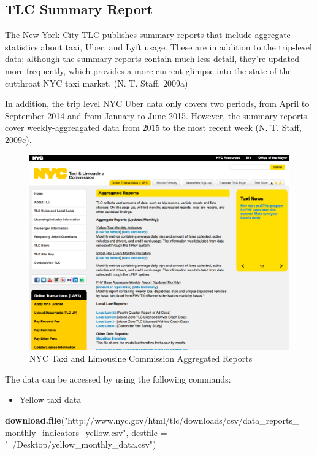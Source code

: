 \documentclass[12pt,twoside]{reedthesis}
\newenvironment{Shaded}{\begin{snugshade}}{\end{snugshade}}
\newcommand{\KeywordTok}[1]{\textcolor[rgb]{0.13,0.29,0.53}{\textbf{#1}}}
\newcommand{\DataTypeTok}[1]{\textcolor[rgb]{0.13,0.29,0.53}{#1}}
\newcommand{\StringTok}[1]{\textcolor[rgb]{0.31,0.60,0.02}{#1}}
\newcommand{\NormalTok}[1]{#1}
\providecommand{\tightlist}{%
  \setlength{\itemsep}{0pt}\setlength{\parskip}{0pt}}
\theoremstyle{definition}
\theoremstyle{definition}
\theoremstyle{definition}
\theoremstyle{remark}
\begin{document}
\subsection{TLC Summary Report}\label{tlc-summary-report}

The New York City TLC publishes summary reports that include aggregate
statistics about taxi, Uber, and Lyft usage. These are in addition to
the trip-level data; although the summary reports contain much less
detail, they're updated more frequently, which provides a more current
glimpse into the state of the cutthroat NYC taxi market. (N. T. Staff,
2009a)

In addition, the trip level NYC Uber data only covers two periods, from
April to September 2014 and from January to June 2015. However, the
summary reports cover weekly-aggreagated data from 2015 to the most
recent week (N. T. Staff, 2009c).
\begin{figure}

{\centering \includegraphics[width=5.84in]{figure/a-report} 

}

\caption{NYC Taxi and Limousine Commission Aggregated Reports}\label{fig:a-report}
\end{figure}
The data can be accessed by using the following commands:
\begin{itemize}
\tightlist
\item
  Yellow taxi data
\end{itemize}
\begin{Shaded}
\begin{Highlighting}[]
\KeywordTok{download.file}\NormalTok{(}\StringTok{"http://www.nyc.gov/html/tlc/downloads/csv/data_reports_}
\StringTok{              monthly_indicators_yellow.csv"}\NormalTok{, }
              \DataTypeTok{destfile =} \StringTok{"~/Desktop/yellow_monthly_data.csv"}\NormalTok{)}
\end{Highlighting}
\end{Shaded}
\end{document}
